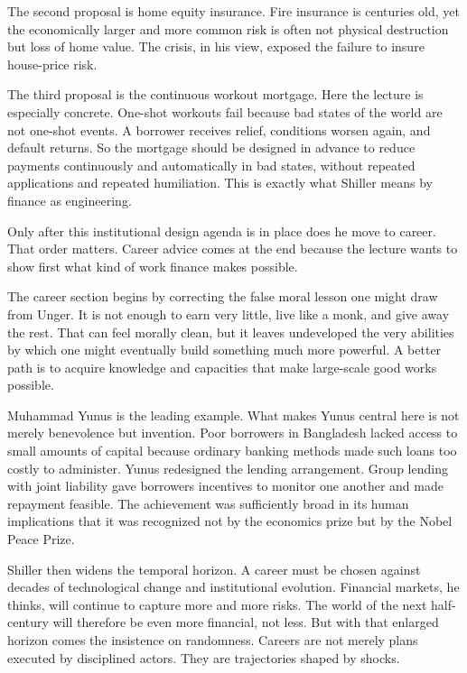 The second proposal is home equity insurance. Fire insurance is centuries old, yet the economically larger and more common risk is often not physical destruction but loss of home value. The crisis, in his view, exposed the failure to insure house-price risk.

The third proposal is the continuous workout mortgage. Here the lecture is especially concrete. One-shot workouts fail because bad states of the world are not one-shot events. A borrower receives relief, conditions worsen again, and default returns. So the mortgage should be designed in advance to reduce payments continuously and automatically in bad states, without repeated applications and repeated humiliation. This is exactly what Shiller means by finance as engineering.

Only after this institutional design agenda is in place does he move to career. That order matters. Career advice comes at the end because the lecture wants to show first what kind of work finance makes possible.

The career section begins by correcting the false moral lesson one might draw from Unger. It is not enough to earn very little, live like a monk, and give away the rest. That can feel morally clean, but it leaves undeveloped the very abilities by which one might eventually build something much more powerful. A better path is to acquire knowledge and capacities that make large-scale good works possible.

Muhammad Yunus is the leading example. What makes Yunus central here is not merely benevolence but invention. Poor borrowers in Bangladesh lacked access to small amounts of capital because ordinary banking methods made such loans too costly to administer. Yunus redesigned the lending arrangement. Group lending with joint liability gave borrowers incentives to monitor one another and made repayment feasible. The achievement was sufficiently broad in its human implications that it was recognized not by the economics prize but by the Nobel Peace Prize.

Shiller then widens the temporal horizon. A career must be chosen against decades of technological change and institutional evolution. Financial markets, he thinks, will continue to capture more and more risks. The world of the next half-century will therefore be even more financial, not less. But with that enlarged horizon comes the insistence on randomness. Careers are not merely plans executed by disciplined actors. They are trajectories shaped by shocks.

